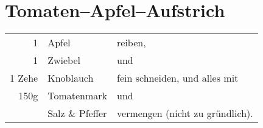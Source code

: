 \section{Tomaten--Apfel--Aufstrich}
\begin{longtable}{rlL{14.67cm}}
    1       &   Apfel           &   reiben, \\
    1       &   Zwiebel         &   und \\
    1 Zehe  &   Knoblauch       &   fein schneiden, und alles mit \\
    150g    &   Tomatenmark     &   und \\
            &   Salz \& Pfeffer &   vermengen (nicht zu gründlich).\\
\end{longtable}
